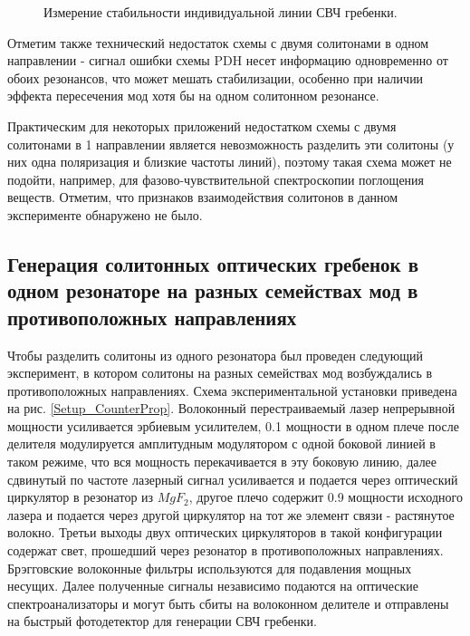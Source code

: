 \begin{figure}[ht]
\begin{minipage}[ht]{1\linewidth}
\end{minipage}
\caption{Измерение стабильности индивидуальной линии СВЧ гребенки.}
\label{single_line_stability_cp}
\end{figure}

Отметим также технический недостаток схемы с двумя солитонами в одном направлении - сигнал ошибки схемы PDH несет информацию одновременно от обоих резонансов, что может мешать стабилизации, особенно при наличии эффекта пересечения мод хотя бы на одном солитонном резонансе.

Практическим для некоторых приложений недостатком схемы с двумя солитонами в 1 направлении является невозможность разделить эти солитоны (у них одна поляризация и близкие частоты линий), поэтому такая схема может не подойти, например, для фазово-чувствительной спектроскопии поглощения веществ. Отметим, что признаков взаимодействия солитонов в данном эксперименте обнаружено не было.

\subsection{Генерация солитонных оптических гребенок в одном резонаторе на разных семействах мод в противоположных направлениях}

Чтобы разделить солитоны из одного резонатора был проведен следующий эксперимент, в котором солитоны на разных семействах мод возбуждались в противоположных направлениях. Схема экспериментальной установки приведена на рис. \ref{Setup_CounterProp}. Волоконный перестраиваемый лазер непрерывной мощности усиливается эрбиевым усилителем, 0.1 мощности в одном плече после делителя модулируется амплитудным модулятором с одной боковой линией в таком режиме, что вся мощность перекачивается в эту боковую линию, далее сдвинутый по частоте лазерный сигнал усиливается и подается через оптический циркулятор в резонатор из $MgF_2$, другое плечо содержит 0.9 мощности исходного лазера и подается через другой циркулятор на тот же элемент связи - растянутое волокно. Третьи выходы двух оптических циркуляторов в такой конфигурации содержат свет, прошедший через резонатор в противоположных направлениях. Брэгговские волоконные фильтры используются для подавления мощных несущих. Далее полученные сигналы независимо подаются на оптические спектроанализаторы и могут быть сбиты на волоконном делителе и отправлены на быстрый фотодетектор для генерации СВЧ гребенки.


